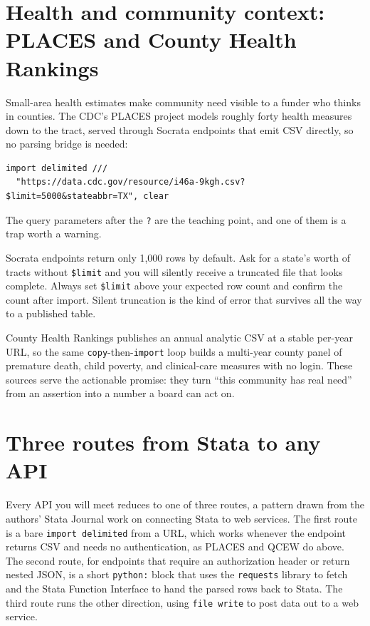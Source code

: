 \documentclass[
    a4paper,
    fontsize=10pt,
    twoside=true,
    numbers=noenddot,
]{kaobook}
\newenvironment{vizcallout}[1][Visualization to build]{%
    \begin{vizbox}[frametitle={#1}]%
}{%
    \end{vizbox}%
}
\begin{document}
\section{Health and community context: PLACES and County Health Rankings}
Small-area health estimates make community need visible to a funder who thinks in counties. The CDC's PLACES project models roughly forty health measures down to the tract, served through Socrata endpoints that emit CSV directly, so no parsing bridge is needed:
{\footnotesize
\begin{verbatim}
import delimited ///
  "https://data.cdc.gov/resource/i46a-9kgh.csv?$limit=5000&stateabbr=TX", clear
\end{verbatim}
}
The query parameters after the \texttt{?} are the teaching point, and one of them is a trap worth a warning.

\begin{vizcallout}[Watch out: the \$limit trap]
Socrata endpoints return only 1,000 rows by default. Ask for a state's worth of tracts without \texttt{\$limit} and you will silently receive a truncated file that looks complete. Always set \texttt{\$limit} above your expected row count and confirm the count after import. Silent truncation is the kind of error that survives all the way to a published table.
\end{vizcallout}

County Health Rankings publishes an annual analytic CSV at a stable per-year URL, so the same \texttt{copy}-then-\texttt{import} loop builds a multi-year county panel of premature death, child poverty, and clinical-care measures with no login. These sources serve the actionable promise: they turn \enquote{this community has real need} from an assertion into a number a board can act on.

\section{Three routes from Stata to any API}\label{sec:threeroutes}
Every API you will meet reduces to one of three routes, a pattern drawn from the authors' Stata Journal work on connecting Stata to web services. The first route is a bare \texttt{import delimited} from a URL, which works whenever the endpoint returns CSV and needs no authentication, as PLACES and QCEW do above. The second route, for endpoints that require an authorization header or return nested JSON, is a short \texttt{python:} block that uses the \texttt{requests} library to fetch and the Stata Function Interface to hand the parsed rows back to Stata. The third route runs the other direction, using \texttt{file write} to post data out to a web service.
\end{document}
